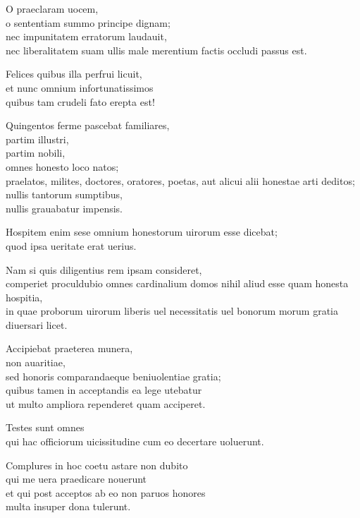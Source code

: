 \documentclass[a5paper,twoside]{article}
\begin{document}
O praeclaram uocem, \\
o sententiam summo principe dignam; \\
nec impunitatem erratorum laudauit, \\
nec liberalitatem suam ullis male merentium factis occludi passus est. 

Felices quibus illa perfrui licuit, \\
et nunc omnium infortunatissimos \\
quibus tam crudeli fato erepta est! 

Quingentos ferme pascebat familiares, \\
partim illustri, \\
partim nobili, \\
omnes honesto loco natos; \\
praelatos, milites, doctores, oratores, poetas, aut alicui alii honestae arti deditos; \\
nullis tantorum sumptibus, \\
nullis grauabatur impensis. 

Hospitem enim sese omnium honestorum uirorum esse dicebat; \\
quod ipsa ueritate erat uerius. 


Nam si quis diligentius rem ipsam consideret, \\
comperiet proculdubio omnes cardinalium domos nihil aliud esse quam honesta hospitia, \\
in quae proborum uirorum liberis uel necessitatis uel bonorum morum gratia diuersari licet.

Accipiebat praeterea munera, \\
non auaritiae, \\
sed honoris comparandaeque beniuolentiae gratia; \\
quibus tamen in acceptandis ea lege utebatur \\
ut multo ampliora rependeret quam acciperet. 

Testes sunt omnes \\
qui hac officiorum uicissitudine cum eo decertare uoluerunt. 

Complures in hoc coetu astare non dubito \\
qui me uera praedicare nouerunt \\
et qui post acceptos ab eo non paruos honores \\
multa insuper dona tulerunt.
\end{document}
